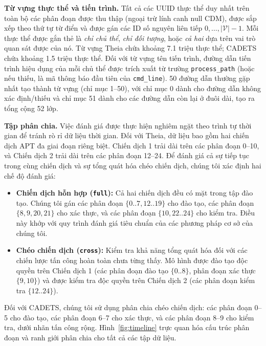 \documentclass[letterpaper,twocolumn,10pt]{article}
\begin{document}
\textbf{Từ vựng thực thể và tiến trình.}
\label{sec:setup}
Tất cả các UUID thực thể duy nhất trên toàn bộ các phân đoạn được thu thập (ngoại trừ lính canh null CDM), được sắp xếp theo thứ tự từ điển và được gán các ID số nguyên liên tiếp $0, \ldots, |\mathcal{V}|-1$. Mỗi thực thể được gắn thẻ là \emph{chỉ chủ thể}, \emph{chỉ đối tượng}, hoặc \emph{cả hai} dựa trên vai trò quan sát được của nó. Từ vựng Theia chứa khoảng 7.1 triệu thực thể; CADETS chứa khoảng 1.5 triệu thực thể. Đối với từ vựng tên tiến trình, đường dẫn tiến trình hiệu dụng của mỗi chủ thể được trích xuất từ trường \texttt{process\_path} (hoặc nếu thiếu, là mã thông báo đầu tiên của \texttt{cmd\_line}). 50 đường dẫn thường gặp nhất tạo thành từ vựng (chỉ mục 1--50), với chỉ mục 0 dành cho đường dẫn không xác định/thiếu và chỉ mục 51 dành cho các đường dẫn còn lại ở đuôi dài, tạo ra tổng cộng 52 lớp.

\textbf{Tập phân chia.} Việc đánh giá được thực hiện nghiêm ngặt theo trình tự thời gian để tránh rò rỉ dữ liệu thời gian. Đối với Theia, dữ liệu bao gồm hai chiến dịch APT đa giai đoạn riêng biệt. Chiến dịch 1 trải dài trên các phân đoạn 0--10, và Chiến dịch 2 trải dài trên các phân đoạn 12--24. Để đánh giá cả sự tiếp tục trong cùng chiến dịch và sự tổng quát hóa chéo chiến dịch, chúng tôi xác định hai chế độ đánh giá:
\begin{itemize}
    \item \textbf{Chiến dịch hỗn hợp (\texttt{full}):} Cả hai chiến dịch đều có mặt trong tập đào tạo. Chúng tôi gán các phân đoạn $\{0..7, 12..19\}$ cho đào tạo, các phân đoạn $\{8, 9, 20, 21\}$ cho xác thực, và các phân đoạn $\{10, 22..24\}$ cho kiểm tra. Điều này khớp với quy trình đánh giá tiêu chuẩn của các phương pháp cơ sở của chúng tôi.
    \item \textbf{Chéo chiến dịch (\texttt{cross}):} Kiểm tra khả năng tổng quát hóa đối với các chiến lược tấn công hoàn toàn chưa từng thấy. Mô hình được đào tạo độc quyền trên Chiến dịch 1 (các phân đoạn đào tạo $\{0..8\}$, phân đoạn xác thực $\{9, 10\}$) và được kiểm tra độc quyền trên Chiến dịch 2 (các phân đoạn kiểm tra $\{12..24\}$).
\end{itemize}
Đối với CADETS, chúng tôi sử dụng phân chia chéo chiến dịch: các phân đoạn 0--5 cho đào tạo, các phân đoạn 6--7 cho xác thực, và các phân đoạn 8--9 cho kiểm tra, dưới nhãn tấn công rộng. Hình~\ref{fig:timeline} trực quan hóa cấu trúc phân đoạn và ranh giới phân chia cho tất cả các tập dữ liệu.


\end{document}
